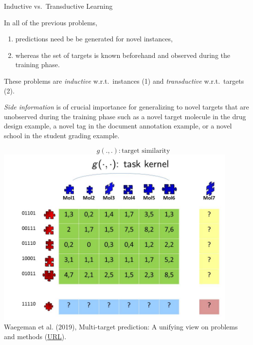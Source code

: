 \documentclass[11pt,compress,t,notes=noshow, xcolor=table]{beamer}
\begin{document}
\begin{frame}{Inductive vs.\ Transductive Learning}
	\small
	\begin{itemize} 
		\item In all of the previous problems, 
		\begin{enumerate} \small
			\item predictions need be be generated for novel instances, 
			\item whereas the set of targets is known beforehand and observed during the training phase.
		\end{enumerate}
		\item[$\leadsto$] These problems are \emph{inductive} w.r.t.\ instances (1) and \emph{transductive} w.r.t.\ targets (2).
		\item  [] 

		\begin{minipage}{0.45\textwidth}    
			\item []
			\item 	\emph{Side information} is of crucial importance for generalizing to novel targets that are unobserved during the training phase such as a novel target molecule in the drug design example, a novel tag in the document annotation example, or a novel school in the student grading example. 
			\item[]
		\end{minipage}
		\begin{minipage}{0.4\textwidth}    
			\begin{center}
				\tiny{$$\qquad g(.,.): \mbox{target similarity}$$}
				\includegraphics[width=0.9\textwidth,trim = 0 0 0 50,clip]{figure/Slide7}  \tiny
				\\ Waegeman et al. (2019), Multi-target prediction:
				A unifying view on problems and methods (\href{https://arxiv.org/pdf/1809.02352.pdf}{\underline{URL}}).
			\end{center}
		\end{minipage}
	\end{itemize}
\end{frame}
\end{document}
